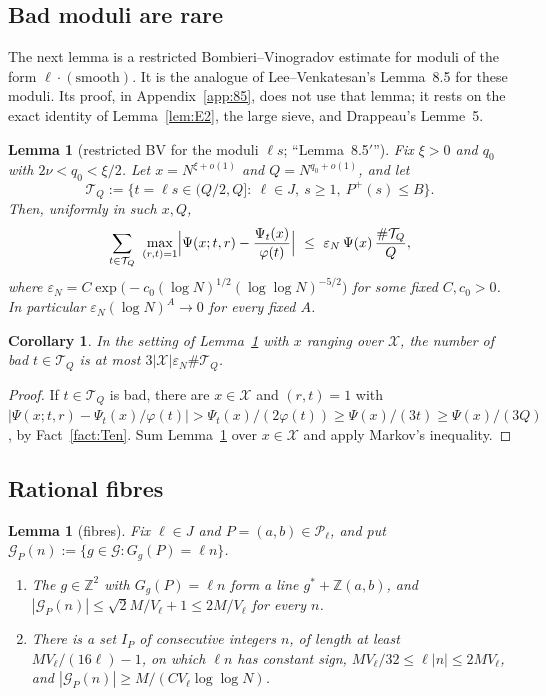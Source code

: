 \documentclass[11pt]{amsart}
\newtheorem{lemma}[theorem]{Lemma}
\newtheorem{corollary}[theorem]{Corollary}
\theoremstyle{definition}
\newcommand{\Z}{\mathbb{Z}}
\newcommand{\cG}{\mathcal{G}}
\newcommand{\cP}{\mathcal{P}}
\newcommand{\cT}{\mathcal{T}}
\newcommand{\cX}{\mathcal{X}}
\newcommand{\Pp}{P^{+}}
\begin{document}
\subsection{Bad moduli are rare}
The next lemma is a restricted Bombieri--Vinogradov estimate for moduli of the form $\ell\cdot(\text{smooth})$.
It is the analogue of Lee--Venkatesan's Lemma~8.5 \cite{lv2018} for these moduli. Its proof, in Appendix~\ref{app:85}, does not use
that lemma; it rests on the exact identity of Lemma~\ref{lem:E2}, the large sieve, and Drappeau's Lemme~5.

\begin{lemma}[restricted BV for the moduli $\ell s$; ``Lemma~8.5$'$'']\label{lem:85}
Fix $\xi>0$ and $q_0$ with $2\nu<q_0<\xi/2$. Let $x=N^{\xi+o(1)}$ and $Q=N^{q_0+o(1)}$, and let
\[
\cT_Q:=\{t=\ell s\in(Q/2,Q]:\ \ell\in J,\ s\ge1,\ \Pp(s)\le B\}.
\]
Then, uniformly in such $x,Q$,
\[
\sum_{t\in\cT_Q}\ \max_{(r,t)=1}\Bigl|\Psi(x;t,r)-\frac{\Psi_t(x)}{\varphi(t)}\Bigr|\ \le\ \varepsilon_N\,\Psi(x)\,\frac{\#\cT_Q}{Q},
\]
where $\varepsilon_N=C\exp\bigl(-c_0(\log N)^{1/2}(\log\log N)^{-5/2}\bigr)$ for some fixed $C,c_0>0$. In particular
$\varepsilon_N(\log N)^{A}\to0$ for every fixed $A$.
\end{lemma}

\begin{corollary}\label{cor:bad}
In the setting of Lemma~\ref{lem:85} with $x$ ranging over $\cX$, the number of bad $t\in\cT_Q$ is at most $3|\cX|\varepsilon_N\#\cT_Q$.
\end{corollary}

\begin{proof}
If $t\in\cT_Q$ is bad, there are $x\in\cX$ and $(r,t)=1$ with
$|\Psi(x;t,r)-\Psi_t(x)/\varphi(t)|>\Psi_t(x)/(2\varphi(t))\ge\Psi(x)/(3t)\ge\Psi(x)/(3Q)$, by Fact~\ref{fact:Ten}. Sum
Lemma~\ref{lem:85} over $x\in\cX$ and apply Markov's inequality.
\end{proof}

\subsection{Rational fibres}

\begin{lemma}[fibres]\label{lem:fibres}
Fix $\ell\in J$ and $P=(a,b)\in\cP_\ell$, and put $\cG_P(n):=\{g\in\cG:G_g(P)=\ell n\}$.
\begin{enumerate}[label=(\roman*)]
\item The $g\in\Z^2$ with $G_g(P)=\ell n$ form a line $g^*+\Z(a,b)$, and $|\cG_P(n)|\le\sqrt2M/V_\ell+1\le2M/V_\ell$ for every $n$.
\item There is a set $I_P$ of consecutive integers $n$, of length at least $MV_\ell/(16\ell)-1$, on which $\ell n$ has constant sign,
  $MV_\ell/32\le\ell|n|\le2MV_\ell$, and $|\cG_P(n)|\ge M/(CV_\ell\log\log N)$.
\end{enumerate}
\end{lemma}
\end{document}
